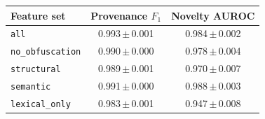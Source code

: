 \begin{tabular}{lcc}
\toprule
Feature set & Provenance $F_1$ & Novelty AUROC \\
\midrule
\texttt{all} & 0.993\,$\pm$\,0.001 & 0.984\,$\pm$\,0.002 \\
\texttt{no\_obfuscation} & 0.990\,$\pm$\,0.000 & 0.978\,$\pm$\,0.004 \\
\texttt{structural} & 0.989\,$\pm$\,0.001 & 0.970\,$\pm$\,0.007 \\
\texttt{semantic} & 0.991\,$\pm$\,0.000 & 0.988\,$\pm$\,0.003 \\
\texttt{lexical\_only} & 0.983\,$\pm$\,0.001 & 0.947\,$\pm$\,0.008 \\
\bottomrule
\end{tabular}